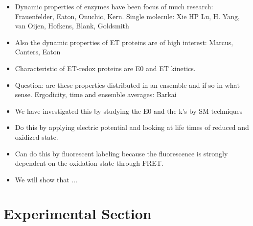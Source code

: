 \begin{itemize}
	\item Dynamic properties of enzymes have been focus of much research: Frauenfelder, Eaton, Onuchic, Kern. Single molecule: Xie HP Lu, H. Yang, van Oijen, Hofkens, Blank, Goldsmith
	\item Also the dynamic properties of ET proteins are of high interest: Marcus, Canters, Eaton
	\item Characteristic of ET-redox proteins are E0 and ET kinetics.
	\item Question: are these properties distributed in an ensemble and if so in what sense. Ergodicity, time and ensemble averages: Barkai
	\item We have investigated this by studying the E0 and the k's by SM techniques
	\item Do this by applying electric potential and looking at life times of reduced and oxidized state.
	\item Can do this by fluorescent labeling because the fluorescence is strongly dependent on the oxidation state through FRET.
	\item We will show that $...$
\end{itemize}
\section{Experimental Section}

